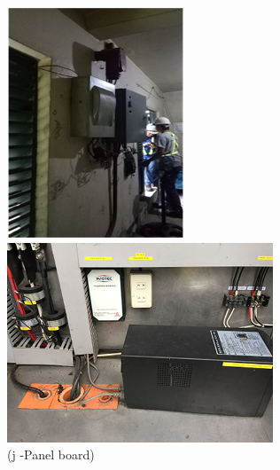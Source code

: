\begin{figure}[!h]
\begin{minipage}[b]{0.22\linewidth}
	\includegraphics[width=\textwidth]{figures/fig_ch04_elecaudit_visualinspection_pannelboard}
	\caption*{(j -Panel board)}
\end{minipage}
	\hspace{0.03cm}
\begin{minipage}[b]{0.22\linewidth}
	\includegraphics[width=\textwidth]{figures/fig_ch04_elecaudit_visualinspection_surge_protection_device}

\end{minipage}
\end{figure}

